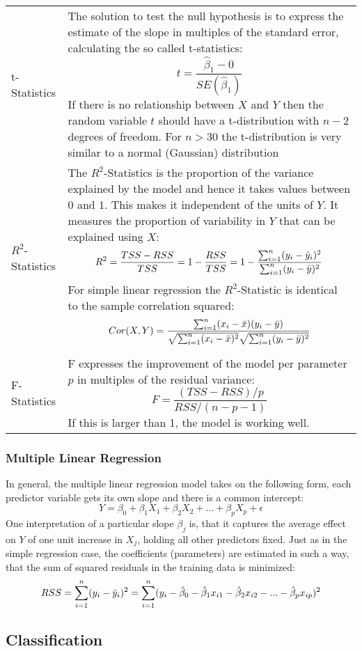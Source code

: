 \begin{onehalfspace}
	\begin{tabularx}{\textwidth}{p{3cm}X}
		t-Statistics & The solution to test the null hypothesis is to express the estimate of the slope in multiples of the	standard error, calculating the so called t-statistics: \[ t = \frac{\hat{\beta}_1 - 0}{SE(\hat{\beta}_1)} \]
		If there is no relationship between $X$ and $Y$ then the random variable $t$ should have a t-distribution with	$n-2$ degrees of freedom. For $n>30$ the t-distribution is very similar to a normal (Gaussian) distribution\\
		$R^2$-Statistics & The $R^2$-Statistics is the proportion of the variance explained by the model and hence it takes values between $0$ and $1$. This makes it independent of the units of $Y$. It measures the proportion of variability in $Y$ that can be explained using $X$:
		\[ R^2=\frac{TSS-RSS}{TSS}=1-\frac{RSS}{TSS}=1-\frac{\sum_{i=1}^{n} (y_i-\hat{y}_i)^2}{\sum_{i=1}^{n} (y_i-\bar{y})^2} \]
		For simple linear regression the $R^2$-Statistic is identical to the sample correlation squared:
		\[ Cor(X,Y)=\frac{\sum_{i=1}^{n} (x_i-\bar{x})(y_i-\bar{y})}{\sqrt{\sum_{i=1}^{n} (x_i-\bar{x})^2}\sqrt{\sum_{i=1}^{n} (y_i-\bar{y})^2}} \]
		\\
		F-Statistics & F expresses the improvement of the model per parameter $p$ in multiples of the residual variance:
		\[ F=\frac{(TSS-RSS)/p}{RSS/(n-p-1)} \]
		If this is larger than 1, the model is working well.
	\end{tabularx}
\end{onehalfspace}

\subsubsection{Multiple Linear Regression}
In general, the multiple linear regression model takes on the following form,
each predictor variable gets its own slope and there is a common intercept:
\[ Y=\beta_0+\beta_1X_1+\beta_2X_2+...+\beta_pX_p+\epsilon \]
One interpretation of a particular slope $\beta_j$ is, that it captures the average effect on $Y$ of one unit increase in $X_j$, holding all other predictors fixed. Just as in the simple regression case, the coefficients (parameters) are estimated in such a way, that the sum of squared residuals in the training data is minimized:
\[ RSS=\sum_{i=1}^{n}(y_i-\bar{y}_i)^2=\sum_{i=1}^{n}(y_i-\hat{\beta}_0-\hat{\beta}_1x_{i1}-\hat{\beta}_2x_{i2}-...-\hat{\beta}_px_{ip})^2 \]



\subsection{Classification}
